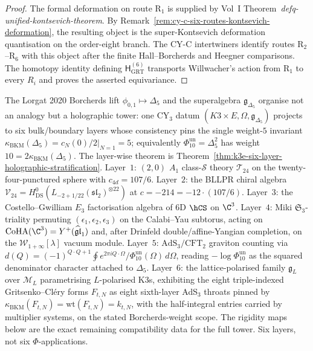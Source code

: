 \begin{proof}
The formal deformation on route R$_1$ is supplied by Vol~I
\cite{VolI}
Theorem~\textit{defq-unified-kontsevich-theorem}.  By
Remark~\ref{rem:cy-c-six-routes-kontsevich-deformation}, the
resulting object is the super-Kontsevich deformation quantisation on
the order-eight branch.  The CY-C intertwiners identify routes
R$_2$--R$_6$ with this object after the finite Hall--Borcherds and
Heegner comparisons.  The homotopy identity defining
$\mathsf H_{\mathrm{GRT}}^{(6)}$ transports Willwacher's action from
R$_1$ to every $R_i$ and proves the asserted equivariance.
\end{proof}

\begin{theorem}
\label{conj:six-layer-holographic-tower}
The Lorgat 2020 Borcherds lift $\phi_{0, 1} \mapsto \Delta_5$ and the superalgebra $\mathfrak{g}_{\Delta_5}$ organise not an analogy but a holographic tower: one CY$_3$ datum $(K3 \times E, \Omega, \mathfrak{g}_{\Delta_5})$ projects to six bulk/boundary layers whose consistency pins the single weight-$5$ invariant $\kappa_{\mathrm{BKM}}(\Delta_5) = \left.c_N(0)/2\right|_{N=1} = 5$; equivalently \(\Phi_{10}^{\mathrm{un}}=\Delta_5^2\) has weight $10=2\kappa_{\mathrm{BKM}}(\Delta_5)$. The layer-wise theorem is Theorem~\ref{thm:k3e-six-layer-holographic-stratification}. Layer~$1$: $(2, 0)$ $A_1$ class-$\mathcal{S}$ theory $\mathcal{T}_{24}$ on the twenty-four-punctured sphere with $c_{4d} = 107/6$. Layer~$2$: the BLLPR chiral algebra $\mathcal{V}_{24} = H^0_{\mathrm{DS}}(L_{-2 + 1/22}(\mathfrak{sl}_2)^{\otimes 22})$ at $c = -214 = -12 \cdot (107/6)$. Layer~$3$: the Costello--Gwilliam $E_3$ factorisation algebra of 6D $\hCS$ on $\C^3$. Layer~$4$: Miki $\mathfrak{S}_3$-triality permuting $(\epsilon_1, \epsilon_2, \epsilon_3)$ on the Calabi--Yau subtorus, acting on $\mathrm{CoHA}(\C^3) = Y^+(\widehat{\mathfrak{gl}}_1)$ and, after Drinfeld double/affine-Yangian completion, on the $\mathcal{W}_{1+\infty}[\lambda]$ vacuum module. Layer~$5$: $\mathrm{AdS}_3/\mathrm{CFT}_2$ graviton counting via \(d(Q) = (-1)^{Q \cdot Q + 1} \oint e^{2\pi i Q \cdot \Omega}/\Phi_{10}^{\mathrm{un}}(\Omega)\,d\Omega\), reading \(-\log \Phi_{10}^{\mathrm{un}}\) as the squared denominator character attached to $\Delta_5$. Layer~$6$: the lattice-polarised family $\mathfrak{g}_L$ over $\mathcal{M}_L$ parametrising $L$-polarised K3s, exhibiting the eight triple-indexed Gritsenko--Cl\'ery forms $F_{t,N}$ as eight sixth-layer AdS$_3$ throats pinned by $\kappa_{\mathrm{BKM}}(F_{t,N})=\mathrm{wt}(F_{t,N})=k_{t,N}$, with the half-integral entries carried by multiplier systems, on the stated Borcherds-weight scope. The rigidity maps below are the exact remaining compatibility data for the full tower. Six layers, not six $\Phi$-applications.

\end{theorem}
